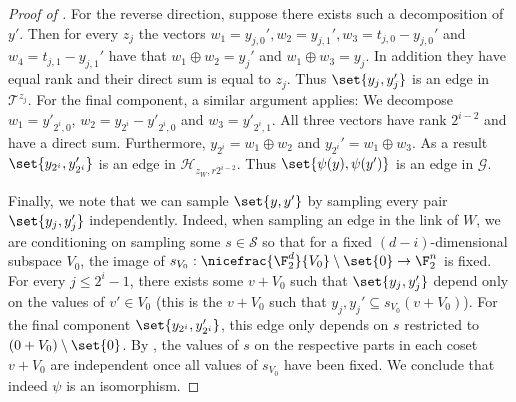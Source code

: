 \begin{proof}[Proof of ]
    For the reverse direction, suppose there exists such a decomposition of \(y'\). Then for every \(z_j\) the vectors \(w_1 = y_{j,0}', w_2=y_{j,1}', w_3 = t_{j,0}-y_{j,0}'\) and \(w_4 = t_{j,1}-y_{j,1}'\) have that \(w_1\oplus w_2 = y_j'\) and \(w_1\oplus w_3 = y_j\). In addition they have equal rank and their direct sum is equal to \(z_j\). Thus \(\set{y_j,y_j'}\) is an edge in \(\mathcal{T}^{z_j}\). For the final component, a similar argument applies: We decompose \(w_1 = y'_{2^i,0}\), \(w_2 = y_{2^i}-y'_{2^i,0}\) and \(w_3 = y'_{2^i,1}\). All three vectors have rank \(2^{i-2}\) and have a direct sum. Furthermore, \(y_{2^i} = w_1\oplus w_2\) and \(y_{2^i}' = w_1 \oplus w_3\). As a result \(\set{y_{2^i},y_{2^i}'}\) is an edge in \(\mathcal{H}_{z_W,r2^{i-2}}\). Thus \(\set{\psi(y),\psi(y')}\) is an edge in \(\mathcal{G}\). 

    Finally, we note that we can sample \(\set{y,y'}\) by sampling every pair \(\set{y_j,y_j'}\) independently. Indeed, when sampling an edge in the link of \(W\), we are conditioning on sampling some \(s \in \mathcal{S}\) so that for a fixed \((d-i)\)-dimensional subspace \(V_0\), the image of \(s_{V_0}:\nicefrac{\F_2^d}{V_0} \setminus \set{0} \to \F_2^n\) is fixed. For every \(j \leq 2^i - 1\), there exists some \(v+V_0\) such that \(\set{y_j,y_j'}\) depend only on the values of \(v' \in V_0\) (this is the \(v+V_0\) such that \(y_j,y_j' \subseteq s_{V_0}(v+V_0)\)). For the final component \(\set{y_{2^i},y_{2^i}'}\), this edge only depends on \(s\) restricted to \((0+V_0) \setminus \set{0}\). By , the values of \(s\) on the respective parts in each coset \(v+V_0\) are independent once all values of \(s_{V_0}\) have been fixed. We conclude that indeed \(\psi\) is an isomorphism.
\end{proof}

